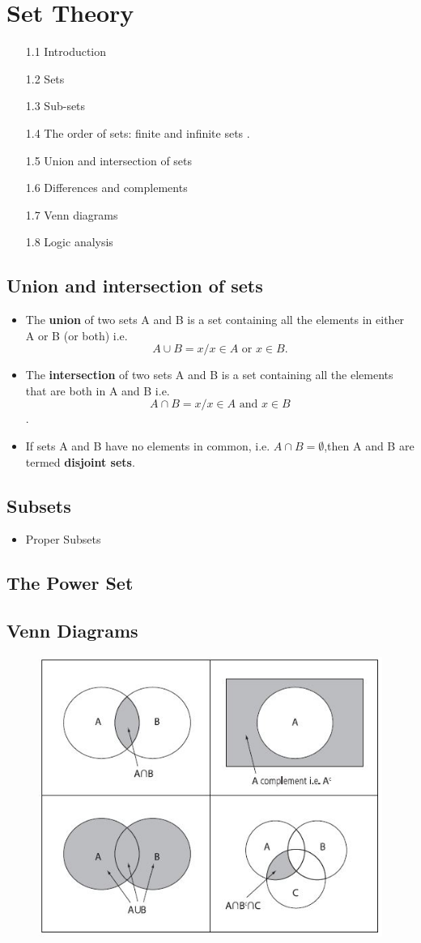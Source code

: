 \documentclass[12pt]{article}
\begin{document}
\section*{Set Theory}
\Large
\begin{itemize}
\item[1.1] Introduction  
\item[1.2] Sets  
\item[1.3] Sub-sets  
\item[1.4] The order of sets: finite and infinite sets .
\item[1.5] Union and intersection of sets  
\item[1.6] Differences and complements  
\item[1.7] Venn diagrams  
\item[1.8] Logic analysis
\end{itemize}  
\newpage
\subsection*{Union and intersection of sets}

\begin{itemize}
\item The \textbf{union} of two sets A and B is a set containing all the elements in
either A or B (or both)
i.e. 
\[A \cup B = {x / x \in A \mbox{ or } x \in B}.\]
\item The \textbf{intersection} of two sets A and B is a set containing all the elements
that are both in A and B
i.e. 
\[A \cap B = {x / x \in A \mbox{ and }x \in B}\].

\item If sets A and B have no elements in common, i.e. $A \cap B = \emptyset$,then A and B
are termed \textbf{disjoint sets}.
\end{itemize}
\newpage
\subsection*{Subsets}

\begin{itemize}
\item Proper Subsets
\end{itemize}
\subsection*{The Power Set}

\newpage
\subsection*{Venn Diagrams}
\begin{figure}
\centering
\includegraphics[width=0.7\linewidth]{venndiagram}

\end{figure}
\end{document}
